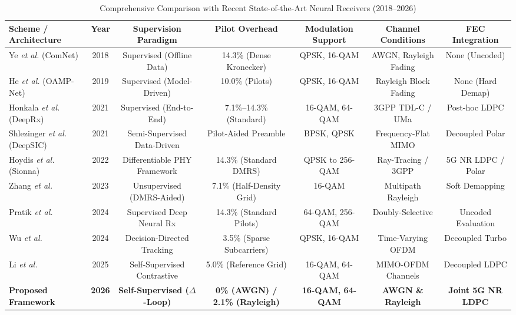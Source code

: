 ﻿\documentclass[journal,twoside]{IEEEtran}
\begin{document}
\begin{table}[t]
\caption{Comprehensive Comparison with Recent State-of-the-Art Neural Receivers (2018--2026)}
\label{tab:sota_comparison}
\centering
\footnotesize
\setlength{\tabcolsep}{3.5pt}
\begin{tabular*}{\textwidth}{@{\extracolsep{\fill}}lcccccc}
\toprule
\textbf{Scheme / Architecture} & \textbf{Year} & \textbf{Supervision Paradigm} & \textbf{Pilot Overhead} & \textbf{Modulation Support} & \textbf{Channel Conditions} & \textbf{FEC Integration} \\
\midrule
Ye \textit{et al.} (ComNet) \cite{ye2018}          & 2018 & Supervised (Offline Data)   & 14.3\% (Dense Kronecker)  & QPSK, 16-QAM        & AWGN, Rayleigh Fading & None (Uncoded) \\
He \textit{et al.} (OAMP-Net) \cite{he2019}        & 2019 & Supervised (Model-Driven)   & 10.0\% (Pilots)           & QPSK, 16-QAM        & Rayleigh Block Fading & None (Hard Demap) \\
Honkala \textit{et al.} (DeepRx) \cite{honkala2021}& 2021 & Supervised (End-to-End)     & 7.1\%--14.3\% (Standard)  & 16-QAM, 64-QAM      & 3GPP TDL-C / UMa      & Post-hoc LDPC \\
Shlezinger \textit{et al.} (DeepSIC) \cite{shlezinger2021}& 2021 & Semi-Supervised Data-Driven & Pilot-Aided Preamble      & BPSK, QPSK          & Frequency-Flat MIMO   & Decoupled Polar \\
Hoydis \textit{et al.} (Sionna) \cite{hoydis2022}  & 2022 & Differentiable PHY Framework& 14.3\% (Standard DMRS)    & QPSK to 256-QAM     & Ray-Tracing / 3GPP    & 5G NR LDPC / Polar \\
Zhang \textit{et al.} \cite{zhang2023}             & 2023 & Unsupervised (DMRS-Aided)   & 7.1\% (Half-Density Grid) & 16-QAM              & Multipath Rayleigh    & Soft Demapping \\
Pratik \textit{et al.} \cite{pratik2024}           & 2024 & Supervised Deep Neural Rx   & 14.3\% (Standard Pilots)  & 64-QAM, 256-QAM     & Doubly-Selective      & Uncoded Evaluation \\
Wu \textit{et al.} \cite{wu2024}                   & 2024 & Decision-Directed Tracking  & 3.5\% (Sparse Subcarriers)& QPSK, 16-QAM        & Time-Varying OFDM     & Decoupled Turbo \\
Li \textit{et al.} \cite{li2025}                   & 2025 & Self-Supervised Contrastive & 5.0\% (Reference Grid)    & 16-QAM, 64-QAM      & MIMO-OFDM Channels    & Decoupled LDPC \\
\textbf{Proposed Framework}                        & \textbf{2026} & \textbf{Self-Supervised ($\Delta$-Loop)} & \textbf{0\% (AWGN) / 2.1\% (Rayleigh)} & \textbf{16-QAM, 64-QAM} & \textbf{AWGN \& Rayleigh} & \textbf{Joint 5G NR LDPC} \\
\bottomrule
\end{tabular*}
\end{table}
\end{document}
